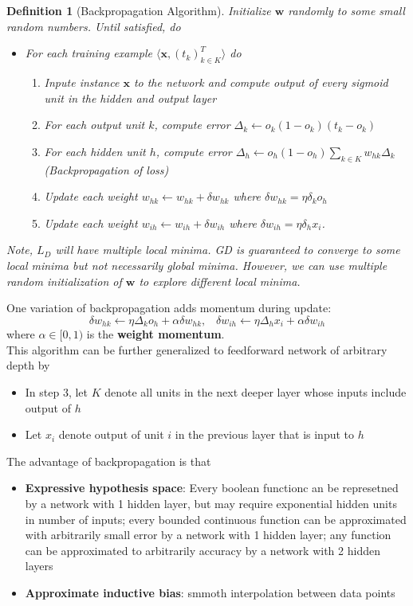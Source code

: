 \documentclass[12pt]{article}
\newtheorem{definition}{Definition}[section]
\theoremstyle{definition}
\begin{document}
\begin{definition}[Backpropagation Algorithm]
\normalfont 
Initialize $\mathbf{w}$ randomly to some small random numbers. Until satisfied, do
\begin{itemize}
	\item For each training example $\langle \mathbf{x}, (t_k)_{k\in K}^T\rangle$ do
	\begin{enumerate}
		\item Inpute instance $\mathbf{x}$ to the network and compute output of every sigmoid unit in the hidden and output layer
		\item For each output unit $k$, compute error $\Delta_k\leftarrow o_k(1-o_k)(t_k-o_k)$
		\item For each hidden unit $h$, compute error $\Delta_h\leftarrow o_h(1-o_h)\sum_{k\in K}w_{hk}\Delta_k$ (Backpropagation of loss)
		\item Update each weight $w_{hk}\leftarrow w_{hk}+\delta w_{hk}$ where $\delta w_{hk}=\eta \delta_k o_h$
		\item Update each weight $w_{ih}\leftarrow w_{ih}+\delta w_{ih}$ where $\delta w_{ih}=\eta \delta_h x_i$. 
	\end{enumerate}
\end{itemize}
Note, $L_D$ will have multiple \textit{local minima}. GD is guaranteed to converge to some local minima but not necessarily global minima. However, we can use \textit{multiple} random initialization of $\mathbf{w}$ to explore different local minima.
\end{definition}
One variation of backpropagation adds momentum during update:
\[
\delta w_{hk}\leftarrow \eta\Delta_ko_h+\alpha\delta w_{hk}, \;\;\;\delta w_{ih}\leftarrow \eta\Delta_hx_i+\alpha\delta w_{ih}
\]
where $\alpha\in[0,1)$ is the \textbf{weight momentum}.\\
This algorithm can be further generalized to feedforward network of arbitrary depth by
\begin{itemize}
	\item In step 3, let $K$ denote all units in the next deeper layer whose inputs include output of $h$
	\item Let $x_i$ denote output of unit $i$ in the previous layer that is input to $h$
\end{itemize}
The advantage of backpropagation is that 
\begin{itemize}
	\item \textbf{Expressive hypothesis space}: Every boolean functionc an be represetned by a network with 1 hidden layer, but may require exponential hidden units in number of inputs; every bounded continuous function can be approximated with arbitrarily small error by a network with 1 hidden layer; any function can be approximated to arbitrarily accuracy by a network with 2 hidden layers
	\item \textbf{Approximate inductive bias}: smmoth interpolation between data points
\end{itemize}
\end{document}
